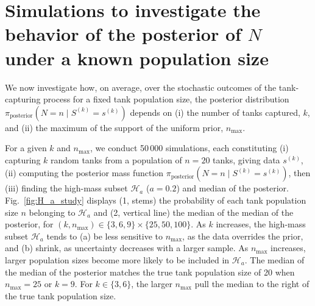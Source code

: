 \documentclass[11pt, oneside]{article}
\begin{document}
\section{Simulations to investigate the behavior of the posterior of $N$ under a known population size}
\label{sec:sims}
We now investigate how, on average, over the stochastic outcomes of the tank-capturing process for a fixed tank population size, the posterior distribution $\pi_{\text{posterior}}(N=n \mid S^{(k)}=s^{(k)})$ depends on (i) the number of tanks captured, $k$, and (ii) the maximum of the support of the uniform prior, $n_{\text{max}}$.

For a given $k$ and $n_{\text{max}}$, we conduct 50\,000 simulations, each constituting (i) capturing $k$ random tanks from a population of $n=20$ tanks, giving data $s^{(k)}$, (ii) computing the posterior mass function $\pi_{\text{posterior}}(N=n \mid S^{(k)}=s^{(k)})$, then (iii) finding the high-mass subset $\mathcal{H}_a$ ($a=0.2$) and median of the posterior. Fig.~\ref{fig:H_a_study} displays (1, stems) the probability of each tank population size $n$ belonging to $\mathcal{H}_a$ and (2, vertical line) the median of the median of the posterior, for $(k, n_{\text{max}})\in \{3, 6, 9\} \times \{25, 50, 100\}$.
As $k$ increases, the high-mass subset $\mathcal{H}_a$ tends to (a) be less sensitive to $n_{\text{max}}$, as the data overrides the prior, and (b) shrink, as uncertainty decreases with a larger sample. As $n_{\text{max}}$ increases, larger population sizes become more likely to be included in $\mathcal{H}_a$.
The median of the median of the posterior matches the true tank population size of 20 when $n_{\text{max}}=25$ or $k=9$. For $k\in\{3, 6\}$, the larger $n_{\text{max}}$ pull the median to the right of the true tank population size.
 
\end{document}
